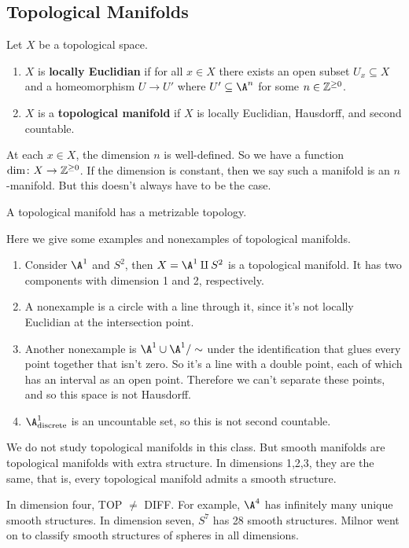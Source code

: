 \subsection{Topological Manifolds}
\begin{definition}[]
    Let $X$ be a topological space.
    \begin{enumerate}[label=(\roman*)]
        \item $X$ is \textbf{locally Euclidian} if for all $x \in X$ there exists an open subset $U_x\subseteq X$ and a homeomorphism $U \to  U'$ where $U' \subseteq \A^n $ for some $n \in  \mathbb{Z}^{\geq 0}$.
        \item $X$ is a \textbf{topological manifold} if $X$ is locally Euclidian, Hausdorff, and second countable.
    \end{enumerate}
\end{definition}
\begin{remark}
    At each $x \in X$, the dimension $n$ is well-defined. So we have a function $\dim \colon X \to \mathbb{Z}^{\geq 0}$. If the dimension is constant, then we say such a manifold is an $n$-manifold. But this doesn't always have to be the case.
\end{remark}
\begin{remark}
    A topological manifold has a metrizable topology.
\end{remark}

\begin{example}
    Here we give some examples and nonexamples of topological manifolds.
    \begin{enumerate}[label=(\arabic*)]
        \item Consider $\A^1$ and $S^2$, then $X=\A^1 \amalg S^2$ is a topological manifold. It has two components with dimension 1 and 2, respectively.
        \item A nonexample is a circle with a line through it, since it's not locally Euclidian at the intersection point.
        \item Another nonexample is $\A^1 \cup  \A^1/\sim$ under the identification that glues every point together that isn't zero. So it's a line with a double point, each of which has an interval as an open point. Therefore we can't separate these points, and so this space is not Hausdorff.
        \item $\A^1 _{\text{discrete} }$ is an uncountable set, so this is not second countable. 
    \end{enumerate}
\end{example}
\begin{remark}
    We do not study topological manifolds in this class. But smooth manifolds are topological manifolds with extra structure. In dimensions 1,2,3, they are the same, that is, every topological manifold admits a smooth structure. 

    In dimension four, TOP $\neq$ DIFF. For example, $\A^4$ has infinitely many unique smooth structures. In dimension seven, $S^7$ has 28 smooth structures. Milnor went on to classify smooth structures of spheres in all dimensions.
\end{remark}
